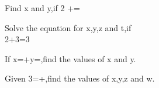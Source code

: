\item Find x and y,if 2 +=\\
\solution

\item Solve the equation for x,y,z and t,if \\
2+3=3\\
\item If x=+y=,find the values of x and y.\\
\solution

\item Given 3=+,find the values of x,y,z and w.\\


